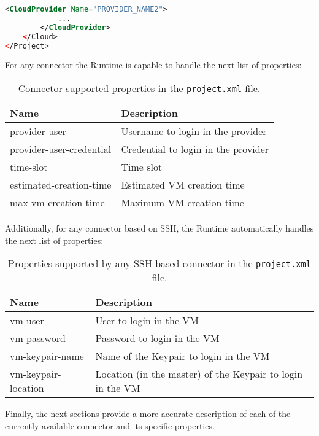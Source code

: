 \begin{lstlisting}[language=xml]
        <CloudProvider Name="PROVIDER_NAME2">
            ...
        </CloudProvider>
    </Cloud>
</Project>
\end{lstlisting}

For any connector the Runtime is capable to handle the next list of properties:

\begin{table}[!ht]
\def\arraystretch{1.2}
\centering
\begin{tabularx}{\linewidth}{|l|X|} \hline
	\textbf{Name} &\textbf{Description} \\ \hline
	provider-user & Username to login in the provider\\ \hline
	provider-user-credential & Credential to login in the provider\\ \hline
	time-slot & Time slot\\ \hline
	estimated-creation-time & Estimated VM creation time\\ \hline                    
	max-vm-creation-time & Maximum VM creation time\\ \hline
\end{tabularx}
\caption{Connector supported properties in the \texttt{project.xml} file.}
\label{tab:abstract_connector_properties}
\end{table}

Additionally, for any connector based on SSH, the Runtime automatically handles the next list of properties:

\begin{table}[!ht]
\def\arraystretch{1.2}
\centering
\begin{tabularx}{\linewidth}{|l|X|} \hline
	\textbf{Name} &\textbf{Description} \\ \hline
	vm-user & User to login in the VM\\ \hline
	vm-password & Password to login in the VM\\ \hline
	vm-keypair-name & Name of the Keypair to login in the VM\\ \hline
	vm-keypair-location & Location (in the master) of the Keypair to login in the VM \\ \hline
\end{tabularx}
\caption{Properties supported by any SSH based connector in the \texttt{project.xml} file.}
\label{tab:ssh_connector_properties}
\end{table}

Finally, the next sections provide a more accurate description of each of the currently available connector and its specific properties.

